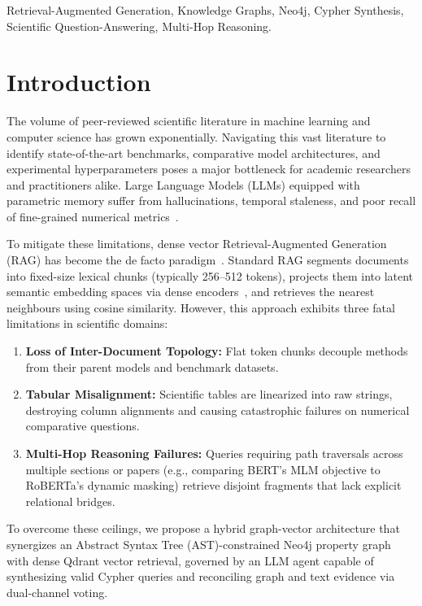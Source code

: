 \documentclass[conference]{IEEEtran}
\begin{document}
\begin{IEEEkeywords}
Retrieval-Augmented Generation, Knowledge Graphs, Neo4j, Cypher Synthesis, Scientific Question-Answering, Multi-Hop Reasoning.
\end{IEEEkeywords}

\section{Introduction}
\label{sec:intro}
The volume of peer-reviewed scientific literature in machine learning and computer science has grown exponentially. Navigating this vast literature to identify state-of-the-art benchmarks, comparative model architectures, and experimental hyperparameters poses a major bottleneck for academic researchers and practitioners alike. Large Language Models (LLMs) equipped with parametric memory suffer from hallucinations, temporal staleness, and poor recall of fine-grained numerical metrics~\cite{vaswani2017attention, devlin2018bert}.

To mitigate these limitations, dense vector Retrieval-Augmented Generation (RAG) has become the de facto paradigm~\cite{lewis2020retrieval}. Standard RAG segments documents into fixed-size lexical chunks (typically 256--512 tokens), projects them into latent semantic embedding spaces via dense encoders~\cite{reimers2019sentence}, and retrieves the nearest neighbours using cosine similarity. However, this approach exhibits three fatal limitations in scientific domains:
\begin{enumerate}
    \item \textbf{Loss of Inter-Document Topology:} Flat token chunks decouple methods from their parent models and benchmark datasets.
    \item \textbf{Tabular Misalignment:} Scientific tables are linearized into raw strings, destroying column alignments and causing catastrophic failures on numerical comparative questions.
    \item \textbf{Multi-Hop Reasoning Failures:} Queries requiring path traversals across multiple sections or papers (e.g., comparing BERT's MLM objective to RoBERTa's dynamic masking) retrieve disjoint fragments that lack explicit relational bridges.
\end{enumerate}

To overcome these ceilings, we propose a hybrid graph-vector architecture that synergizes an Abstract Syntax Tree (AST)-constrained Neo4j property graph with dense Qdrant vector retrieval, governed by an LLM agent capable of synthesizing valid Cypher queries and reconciling graph and text evidence via dual-channel voting.
\end{document}
